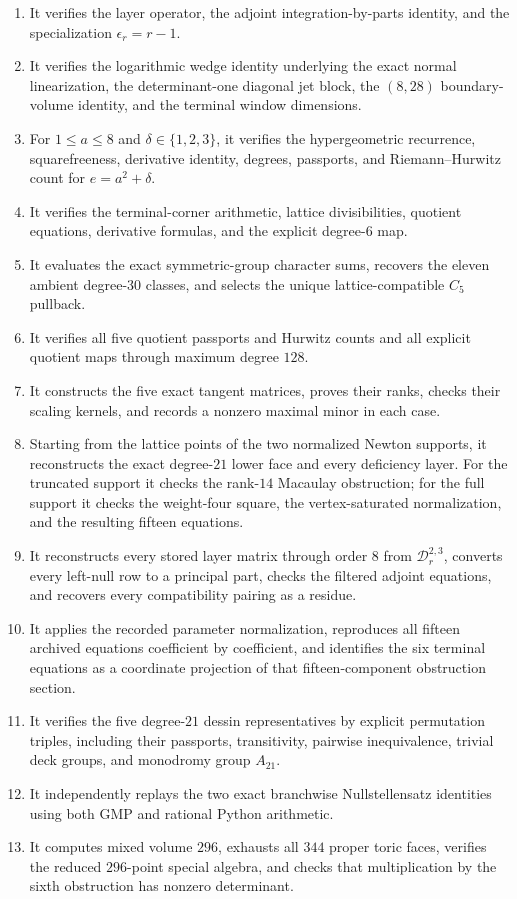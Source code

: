 \documentclass[11pt,reqno]{amsart}
\begin{document}
\begin{enumerate}[label=(\arabic*)]
\item It verifies the layer operator, the adjoint integration-by-parts
identity, and the specialization \(\epsilon_r=r-1\).
\item It verifies the logarithmic wedge identity underlying the exact normal
linearization, the determinant-one diagonal jet block, the
\((8,28)\) boundary-volume identity, and the terminal window dimensions.
\item For \(1\le a\le8\) and \(\delta\in\{1,2,3\}\), it verifies the
hypergeometric recurrence, squarefreeness, derivative identity, degrees,
passports, and Riemann--Hurwitz count for \(e=a^2+\delta\).
\item It verifies the terminal-corner arithmetic, lattice divisibilities,
quotient equations, derivative formulas, and the explicit degree-\(6\)
map.
\item It evaluates the exact symmetric-group character sums, recovers the
eleven ambient degree-\(30\) classes, and selects the unique
lattice-compatible \(C_5\) pullback.
\item It verifies all five quotient passports and Hurwitz counts and all
explicit quotient maps through maximum degree \(128\).
\item It constructs the five exact tangent matrices, proves their ranks,
checks their scaling kernels, and records a nonzero maximal minor in each
case.
\item Starting from the lattice points of the two normalized Newton
supports, it reconstructs the exact degree-\(21\) lower face and every
deficiency layer.  For the truncated support it checks the rank-\(14\)
Macaulay obstruction; for the full support it checks the weight-four square,
the vertex-saturated normalization, and the resulting fifteen equations.
\item It reconstructs every stored layer matrix through order \(8\) from
\(\mathscr D_r^{2,3}\), converts every left-null row to a principal part,
checks the filtered adjoint equations, and recovers every compatibility
pairing as a residue.
\item It applies the recorded parameter normalization, reproduces all
fifteen archived equations coefficient by coefficient, and identifies the
six terminal equations as a coordinate projection of that fifteen-component
obstruction section.
\item It verifies the five degree-\(21\) dessin representatives by explicit
permutation triples, including their passports, transitivity, pairwise
inequivalence, trivial deck groups, and monodromy group \(A_{21}\).
\item It independently replays the two exact branchwise Nullstellensatz
identities using both GMP and rational Python arithmetic.
\item It computes mixed volume \(296\), exhausts all \(344\) proper toric
faces, verifies the reduced \(296\)-point special algebra, and checks that
multiplication by the sixth obstruction has nonzero determinant.
\end{enumerate}
\end{document}
